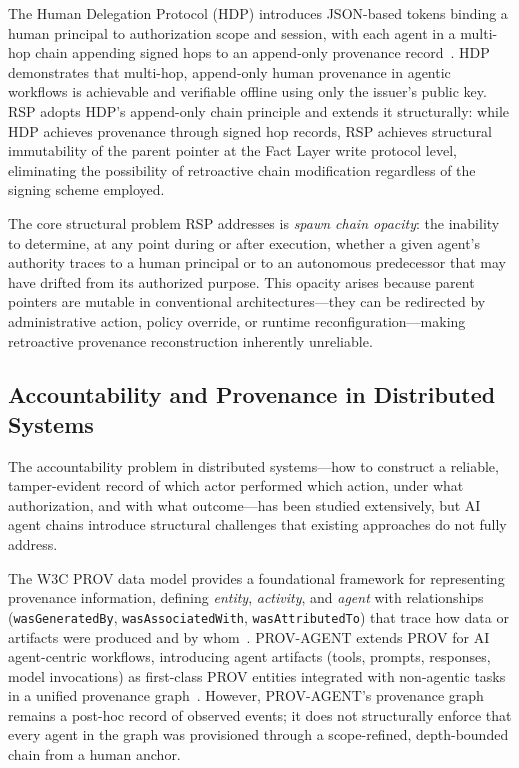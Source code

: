 The Human Delegation Protocol (HDP) introduces JSON-based tokens binding a human principal to authorization scope and session, with each agent in a multi-hop chain appending signed hops to an append-only provenance record~\cite{hdp-draft,hdp-draft-2}. HDP demonstrates that multi-hop, append-only human provenance in agentic workflows is achievable and verifiable offline using only the issuer's public key. RSP adopts HDP's append-only chain principle and extends it structurally: while HDP achieves provenance through signed hop records, RSP achieves structural immutability of the parent pointer at the Fact Layer write protocol level, eliminating the possibility of retroactive chain modification regardless of the signing scheme employed.

The core structural problem RSP addresses is \emph{spawn chain opacity}: the inability to determine, at any point during or after execution, whether a given agent's authority traces to a human principal or to an autonomous predecessor that may have drifted from its authorized purpose. This opacity arises because parent pointers are mutable in conventional architectures---they can be redirected by administrative action, policy override, or runtime reconfiguration---making retroactive provenance reconstruction inherently unreliable.

\subsection{Accountability and Provenance in Distributed Systems}

The accountability problem in distributed systems---how to construct a reliable, tamper-evident record of which actor performed which action, under what authorization, and with what outcome---has been studied extensively, but AI agent chains introduce structural challenges that existing approaches do not fully address.

The W3C PROV data model provides a foundational framework for representing provenance information, defining \emph{entity}, \emph{activity}, and \emph{agent} with relationships (\texttt{wasGeneratedBy}, \texttt{wasAssociatedWith}, \texttt{wasAttributedTo}) that trace how data or artifacts were produced and by whom~\cite{moreau2015-prov}. PROV-AGENT extends PROV for AI agent-centric workflows, introducing agent artifacts (tools, prompts, responses, model invocations) as first-class PROV entities integrated with non-agentic tasks in a unified provenance graph~\cite{prov-agent2025}. However, PROV-AGENT's provenance graph remains a post-hoc record of observed events; it does not structurally enforce that every agent in the graph was provisioned through a scope-refined, depth-bounded chain from a human anchor.

